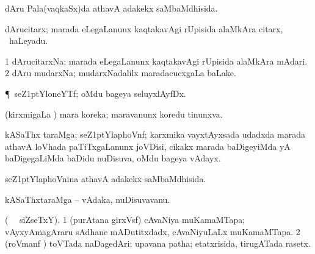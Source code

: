 \bentry
{} 
\gl{\gu} 
\bmng
dAru Pala(vaqkaSx)da athavA adakekx saMbaMdhisida.
\emng
\eentry

\bentry
{} 
\gl{\nA}
\bmng
dArucitarx; marada eLegaLanunx kaqtakavAgi rUpisida alaMkAra citarx, \kanmu\ haLeyadu.
\emng
\eentry

\bentry
{} 
\gl{\nA} 
\bmng
\bnum
\num{1} dArucitarxNa; marada  eLegaLanunx kaqtakavAgi rUpisida alaMkAra mAdari. 
\num{2} dAru mudarxNa; mudarxNadalilx maradacucxgaLa baLake.
\enum
\emng
\eentry

\bentry
{} 
\gl{\nA} 
\bmng
\P\ seZ\kern1ptYloneYTf; oMdu bageya seluyxlAyfDx.
\emng
\eentry

\bentry
{} 
\gl{\gu} 
\bmng
(kirxmigaLa \vi) mara  koreka; maravanunx koredu tinunxva.
\emng 
\eentry

\bentry
{}  
\gl{\nA}
\bmng
kASaThx taraMga; seZ\kern1ptYlaphoVnf; karxmika vayxtAyxsada udadxda  marada athavA loVhada paTiTxgaLanunx joVDisi, cikakx marada baDigeyiMda yA baDigegaLiMda baDidu   nuDisuva, oMdu bageya vAdayx. 
\emng
\eentry

\bentry
{}  
\gl{\gu} 
\bmng
seZ\kern1ptYlaphoVnina athavA adakekx  saMbaMdhisida.
\emng
\eentry

\bentry
{} 
\gl{\nA}
\bmng
kASaThxtaraMga -- vAdaka, nuDisuvavanu.
\emng 
\eentry

\bentry
{}
\gl{\nA}
\bmng
(\bava\   \ucAcx\ siZseTxY).
\bnum
\num{1} (purAtana girxVsf) cAvaNiya muKamaMTapa; vAyxyAmagAraru sAdhane mADutitxdadx, cAvaNiyuLaLx muKamaMTapa. 
\num{2} (roVmanf \pArxca) toVTada naDagedAri; upavana patha; etatxrisida, tirugATada rasetx.
\enum
\emng
\eentry

%

